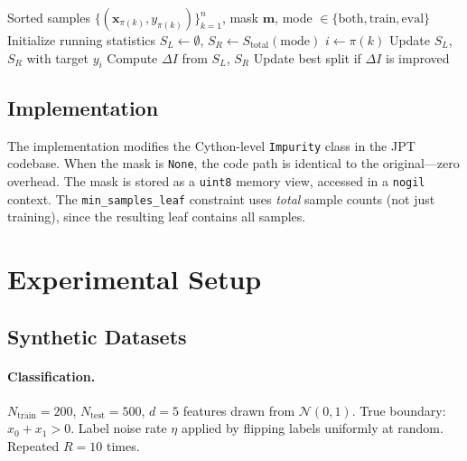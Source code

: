 \documentclass[11pt,a4paper]{article}
\begin{document}
\begin{algorithm}[h]
\caption{Split validation in the impurity inner loop}
\label{alg:split_val}
\begin{algorithmic}[1]
\REQUIRE Sorted samples $\{(\mathbf{x}_{\pi(k)}, y_{\pi(k)})\}_{k=1}^{n}$,
         mask $\mathbf{m}$, mode $\in \{\text{both}, \text{train}, \text{eval}\}$
\STATE Initialize running statistics $S_L \leftarrow \emptyset$,
       $S_R \leftarrow S_{\text{total}}(\text{mode})$
    \STATE $i \leftarrow \pi(k)$ 
        \STATE Update $S_L$, $S_R$ with target $y_i$
    \ENDIF
        \STATE Compute $\Delta I$ from $S_L$, $S_R$
        \STATE Update best split if $\Delta I$ is improved
    \ENDIF
\ENDFOR
\end{algorithmic}
\end{algorithm}

\subsection{Implementation}

The implementation modifies the Cython-level \texttt{Impurity} class in the JPT
codebase. When the mask is \texttt{None}, the code path is identical to the
original---zero overhead. The mask is stored as a \texttt{uint8} memory view,
accessed in a \texttt{nogil} context. The \texttt{min\_samples\_leaf} constraint
uses \emph{total} sample counts (not just training), since the resulting leaf
contains all samples.

\section{Experimental Setup}
\label{sec:setup}

\subsection{Synthetic Datasets}

\paragraph{Classification.}
$N_{\text{train}} = 200$, $N_{\text{test}} = 500$, $d = 5$ features drawn from
$\mathcal{N}(0, 1)$. True boundary: $x_0 + x_1 > 0$. Label noise rate $\eta$
applied by flipping labels uniformly at random. Repeated $R = 10$ times.
\end{document}
